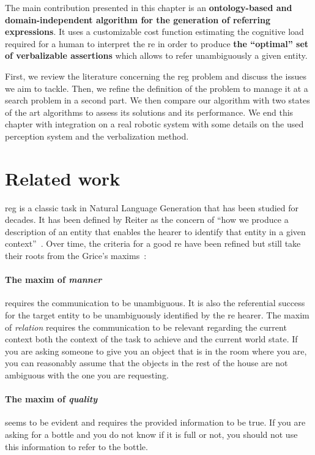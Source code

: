 The main contribution presented in this chapter is an \textbf{ontology-based and domain-independent algorithm for the generation of referring expressions}. It uses a customizable cost function estimating the cognitive load required for a human to interpret the \acrshort{re} in order to produce \textbf{the ``optimal'' set of verbalizable assertions} which allows to refer unambiguously a given entity.

First, we review the literature concerning the \acrshort{reg} problem and discuss the issues we aim to tackle. Then, we refine the definition of the problem to manage it at a search problem in a second part. We then compare our algorithm with two states of the art algorithms to assess its solutions and its performance. We end this chapter with integration on a real robotic system with some details on the used perception system and the verbalization method.

\section{Related work}

\acrlong{reg} is a classic task in Natural Language Generation \cite{gatt_2018_survey} that has been studied for decades. It has been defined by Reiter as the concern of ``how we produce a description of an entity that enables the hearer to identify that entity in a given context''~\cite{reiter_2000_building}. Over time, the criteria for a good \acrfull{re} have been refined but still take their roots from the Grice's maxims~\cite{grice_1975_logic}:

\paragraph{The maxim of \textit{manner}} requires the communication to be unambiguous. It is also the referential success for the target entity to be unambiguously identified by the \acrshort{re} hearer. The maxim of \textit{relation} requires the communication to be relevant regarding the current context both the context of the task to achieve and the current world state. If you are asking someone to give you an object that is in the room where you are, you can reasonably assume that the objects in the rest of the house are not ambiguous with the one you are requesting. 

\paragraph{The maxim of \textit{quality}} seems to be evident and requires the provided information to be true. If you are asking for a bottle and you do not know if it is full or not, you should not use this information to refer to the bottle. 

